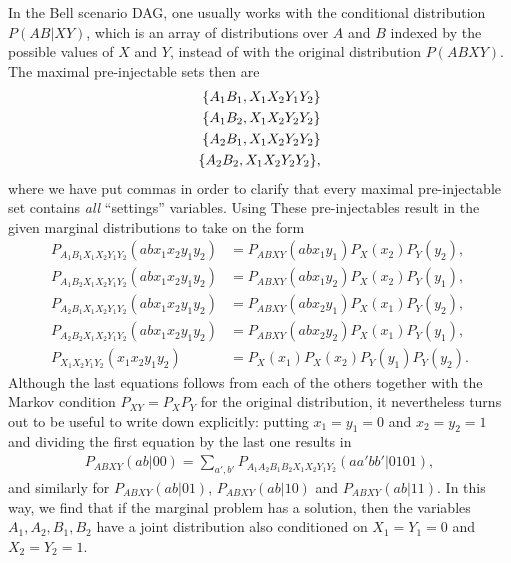 In the Bell scenario DAG, one usually works with the conditional distribution $P(AB|XY)$, which is an array of distributions over $A$ and $B$ indexed by the possible values of $X$ and $Y$, instead of with the original distribution $P(ABXY)$. The maximal pre-injectable sets then are
\begin{align*}
\brackets{A_1 B_1, X_1 X_2 Y_1 Y_2} \\
\brackets{A_1 B_2, X_1 X_2 Y_2 Y_2} \\
\brackets{A_2 B_1, X_1 X_2 Y_2 Y_2} \\
\brackets{A_2 B_2, X_1 X_2 Y_2 Y_2} ,
\end{align*}
where we have put commas in order to clarify that every maximal pre-injectable set contains \emph{all} ``settings'' variables. Using These pre-injectables result in the given marginal distributions to take on the form
\begin{align*}
	P_{A_1 B_1 X_1 X_2 Y_1 Y_2}(a b x_1 x_2 y_1 y_2) & = P_{A B X Y}(a b x_1 y_1) P_X(x_2) P_Y(y_2), \\
	P_{A_1 B_2 X_1 X_2 Y_1 Y_2}(a b x_1 x_2 y_1 y_2) & = P_{A B X Y}(a b x_1 y_2) P_X(x_2) P_Y(y_1), \\
	P_{A_2 B_1 X_1 X_2 Y_1 Y_2}(a b x_1 x_2 y_1 y_2) & = P_{A B X Y}(a b x_2 y_1) P_X(x_1) P_Y(y_2), \\
	P_{A_2 B_2 X_1 X_2 Y_1 Y_2}(a b x_1 x_2 y_1 y_2) & = P_{A B X Y}(a b x_2 y_2) P_X(x_1) P_Y(y_1), \\
		P_{X_1 X_2 Y_1 Y_2}(x_1 x_2 y_1 y_2) & = P_X(x_1) P_X(x_2) P_Y(y_1) P_Y(y_2).
\end{align*}
Although the last equations follows from each of the others together with the Markov condition $P_{XY} = P_X P_Y$ for the original distribution, it nevertheless turns out to be useful to write down explicitly: putting $x_1 = y_1 = 0$ and $x_2 = y_2 = 1$ and dividing the first equation by the last one results in
\begin{align*}
	P_{A B X Y}(a b | 0 0)  =  \sum_{a',b'} P_{A_1 A_2 B_1 B_2 X_1 X_2 Y_1 Y_2}(aa'bb'|0101),
\end{align*}
and similarly for $P_{A B X Y}(a b | 0 1)$, $P_{A B X Y}(a b | 1 0)$ and $P_{A B X Y}(a b | 1 1)$. In this way, we find that if the marginal problem has a solution, then the variables $A_1,A_2,B_1,B_2$ have a joint distribution also conditioned on $X_1=Y_1=0$ and $X_2=Y_2=1$.

